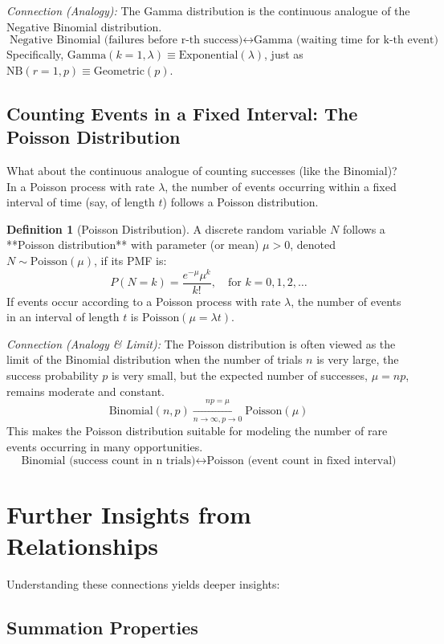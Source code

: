 \documentclass[11pt, letterpaper]{article}
\theoremstyle{definition}
\newtheorem{definition}[theorem]{Definition}
\theoremstyle{remark}
\begin{document}
\textit{Connection (Analogy):} The Gamma distribution is the continuous analogue of the Negative Binomial distribution.
$$ \text{Negative Binomial (failures before r-th success)} \longleftrightarrow \text{Gamma (waiting time for k-th event)} $$
Specifically, $\text{Gamma}(k=1, \lambda) \equiv \text{Exponential}(\lambda)$, just as $\text{NB}(r=1, p) \equiv \text{Geometric}(p)$.

\subsection{Counting Events in a Fixed Interval: The Poisson Distribution}

What about the continuous analogue of counting successes (like the Binomial)? In a Poisson process with rate $\lambda$, the number of events occurring within a fixed interval of time (say, of length $t$) follows a Poisson distribution.

\begin{definition}[Poisson Distribution]
A discrete random variable $N$ follows a **Poisson distribution** with parameter (or mean) $\mu > 0$, denoted $N \sim \text{Poisson}(\mu)$, if its PMF is:
$$ P(N=k) = \frac{e^{-\mu} \mu^k}{k!}, \quad \text{for } k = 0, 1, 2, \dots $$
If events occur according to a Poisson process with rate $\lambda$, the number of events in an interval of length $t$ is $\text{Poisson}(\mu = \lambda t)$.
\end{definition}

\textit{Connection (Analogy \& Limit):} The Poisson distribution is often viewed as the limit of the Binomial distribution when the number of trials $n$ is very large, the success probability $p$ is very small, but the expected number of successes, $\mu = np$, remains moderate and constant. %
$$ \text{Binomial}(n, p) \xrightarrow[n \to \infty, p \to 0]{np = \mu} \text{Poisson}(\mu) $$
This makes the Poisson distribution suitable for modeling the number of rare events occurring in many opportunities.
$$ \text{Binomial (success count in n trials)} \longleftrightarrow \text{Poisson (event count in fixed interval)} $$

\section{Further Insights from Relationships}

Understanding these connections yields deeper insights:

\subsection{Summation Properties}
\end{document}

